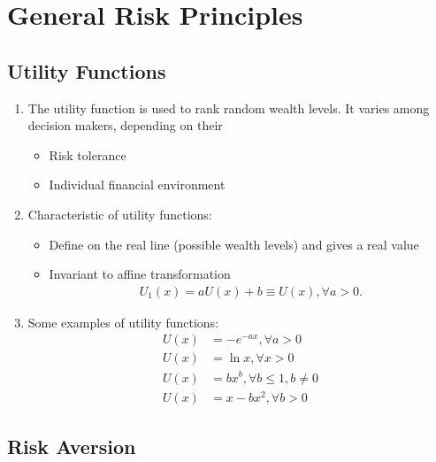 \documentclass[12pt,twoside]{article}
\begin{document}
\newpage 

\section{General Risk Principles}
\subsection{Utility Functions}

\begin{enumerate}
\item The utility function is used to rank random wealth levels. It varies among decision makers, depending on their
	\begin{itemize}
		\item Risk tolerance
		\item Individual financial environment
	\end{itemize}

\item Characteristic of utility functions:
	\begin{itemize}
		\item Define on the real line (possible wealth levels) and gives a real value
		\item Invariant to affine transformation
			\begin{align*}
				U_1(x) = aU(x) + b \equiv U(x), \forall a>0.
			\end{align*}				
	\end{itemize}

\item Some examples of utility functions:
	\begin{align*}
		U(x) & = - e^{-ax}, \forall a>0\\
		U(x) & = \ln x, \forall x>0\\
		U(x) & = bx^b, \forall b\leq 1, b\neq 0\\
		U(x) & = x - bx^2, \forall b>0
	\end{align*}
	


\end{enumerate}

\subsection{Risk Aversion}
\end{document}
